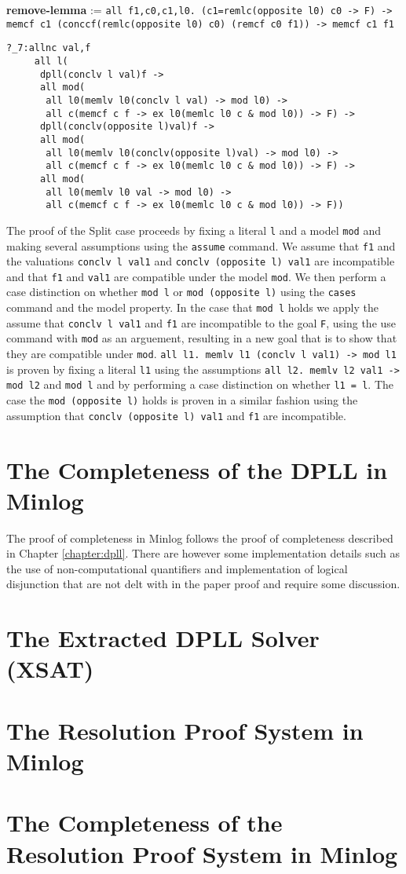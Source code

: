 \begin{center}
\textbf{remove-lemma} := \texttt{all f1,c0,c1,l0. (c1=remlc(opposite l0) c0 -> F) -> memcf c1 (conccf(remlc(opposite l0) c0) (remcf c0 f1)) -> memcf c1 f1}  
\end{center}

\begin{lstlisting}[caption = "The Split Case in Minlog"]
?_7:allnc val,f
     all l(
      dpll(conclv l val)f ->
      all mod(
       all l0(memlv l0(conclv l val) -> mod l0) ->
       all c(memcf c f -> ex l0(memlc l0 c & mod l0)) -> F) ->
      dpll(conclv(opposite l)val)f ->
      all mod(
       all l0(memlv l0(conclv(opposite l)val) -> mod l0) ->
       all c(memcf c f -> ex l0(memlc l0 c & mod l0)) -> F) ->
      all mod(
       all l0(memlv l0 val -> mod l0) ->
       all c(memcf c f -> ex l0(memlc l0 c & mod l0)) -> F))
\end{lstlisting}

The proof of the Split case proceeds by fixing a literal \texttt{l} and a model \texttt{mod} and making several assumptions using the \texttt{assume} command. We assume that \texttt{f1} and the valuations \texttt{conclv l val1} and \texttt{conclv (opposite l) val1} are incompatible and that \texttt{f1} and \texttt{val1} are compatible under the model \texttt{mod}. We then perform a case distinction on whether \texttt{mod l}  or \texttt{mod (opposite l)} using the \texttt{cases} command and the model property. In the case that \texttt{mod l} holds we apply the assume that \texttt{conclv l val1} and \texttt{f1} are incompatible  to the goal \texttt{F}, using the use  command with \texttt{mod} as an arguement, resulting in a new goal that is to show that they are compatible under \texttt{mod}. \texttt{all l1. memlv l1 (conclv l val1) -> mod l1} is proven by fixing a literal \texttt{l1} using the assumptions \texttt{all l2. memlv l2 val1 -> mod l2} and \texttt{mod l} and by performing a case distinction on whether \texttt{l1 = l}. The case the \texttt{mod (opposite l)} holds is proven in a similar fashion using the assumption that \texttt{conclv (opposite l) val1} and \texttt{f1} are incompatible.

\section{The Completeness of the DPLL in Minlog}
The proof of completeness in Minlog follows the proof of completeness described in Chapter \ref{chapter:dpll}. There are however some implementation details such as the use of non-computational quantifiers and implementation of logical disjunction that are not delt with in the paper proof and require some discussion.



\section{The Extracted DPLL Solver (XSAT)}

\section{The Resolution Proof System in Minlog}

\section{The Completeness of the Resolution Proof System in Minlog}